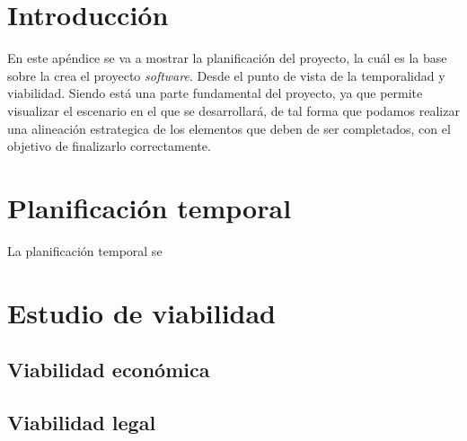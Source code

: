 
\section{Introducción}
En este apéndice se va a mostrar la planificación del proyecto, la cuál es la base sobre la crea el proyecto \textit{software}. Desde el punto de vista de la temporalidad y viabilidad. 
Siendo está una parte fundamental del proyecto, ya que permite visualizar el escenario en el que se desarrollará, de tal forma que podamos realizar una alineación estrategica de los elementos que deben de ser completados, con el objetivo de finalizarlo correctamente.

\section{Planificación temporal}
La planificación temporal se

\section{Estudio de viabilidad}

\subsection{Viabilidad económica}

\subsection{Viabilidad legal}



